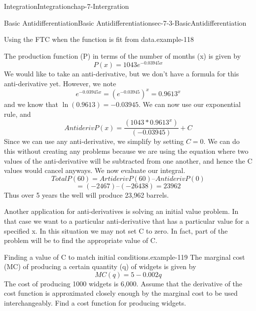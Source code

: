 \documentclass[oneside,10pt,]{book}
\numberwithin{equation}{section}
\begin{document}
\begin{chapterptx}{Integration}{}{Integration}{}{}{chap-7-Intergration}
\begin{sectionptx}{Basic Antidifferentiation}{}{Basic Antidifferentiation}{}{}{sec-7-3-BasicAntidifferentiation}
\begin{example}{Using the FTC when the function is fit from data.}{example-118}
\par
\hypertarget{p-2767}{}%
The production function (P) in terms of the number of months (x) is given by%
%
\begin{equation*}
P(x)=1043 e^{-0.03945 x}
\end{equation*}
\hypertarget{p-2768}{}%
We would like to take an anti-derivative, but we don’t have a formula for this anti-derivative yet.  However, we note%
%
\begin{equation*}
e^{-0.03945 x}=  (e^{-0.03945} )^x=0.9613^x
\end{equation*}
\hypertarget{p-2769}{}%
and we know that \(\ln (0.9613)=-0.03945\). We can now use our exponential rule, and%
%
\begin{equation*}
AntiderivP(x)=\frac{(1043*0.9613^x)}{(-0.03945)}+C
\end{equation*}
\hypertarget{p-2770}{}%
Since we can use any anti-derivative, we simplify by setting \(C = 0\). We can do this without creating any problems because we are using the equation where two values of the anti-derivative will be subtracted from one another, and hence the C values would cancel anyways. We now evaluate our integral.%
%
\begin{equation*}
TotalP(60)= ArtiderivP(60)– AntiderivP(0)
\end{equation*}
%
\begin{equation*}
= (-2467) – (-26438) = 23962
\end{equation*}
\hypertarget{p-2771}{}%
Thus over 5 years the well will produce 23,962 barrels.%
\end{example}
\hypertarget{p-2772}{}%
Another application for anti-derivatives is solving an initial value problem.  In that case we want to a particular anti-derivative that has a particular value for a specified x. In this situation we may not set C to zero. In fact, part of the problem will be to find the appropriate value of C.%
\begin{example}{Finding a value of C to match initial conditions.}{example-119}%
\hypertarget{p-2773}{}%
The marginal cost (MC) of producing a certain quantity (q) of widgets is given by%
%
\begin{equation*}
MC(q)=5-0.002 q
\end{equation*}
\hypertarget{p-2774}{}%
The cost of producing 1000 widgets is \textdollar{}6,000.  Assume that the derivative of the cost function is approximated closely enough by the marginal cost to be used interchangeably.  Find a cost function for producing widgets.%
\par

\end{example}
\end{sectionptx}
\end{chapterptx}
\end{document}
